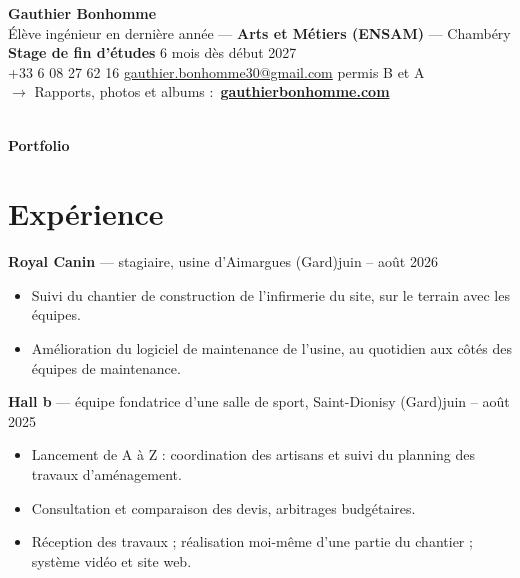 \documentclass[10pt,a4paper]{article}
\newcommand{\sep}{\,{\scriptsize\textbullet}\,}
\newcommand{\entry}[2]{\par\vspace{0.5em}#1\hfill #2\par}
\begin{document}
\begin{minipage}[c]{0.13\linewidth}\hfill\end{minipage}%
\begin{minipage}[c]{0.74\linewidth}
\centering
  {\Huge\bfseries Gauthier Bonhomme}\\[0.45em]
  Élève ingénieur en dernière année --- \textbf{Arts et Métiers (ENSAM)} --- Chambéry\\[0.15em]
  {\color{linkblue}\bfseries Stage de fin d'études}\sep 6 mois dès début 2027\\[0.25em]
  {\small +33 6 08 27 62 16\sep \href{mailto:gauthier.bonhomme30@gmail.com}{gauthier.bonhomme30@gmail.com}\sep permis B et A}\\[0.1em]
  {\small\color{linkblue}$\rightarrow$ Rapports, photos et albums :\ \textbf{\href{https://gauthierbonhomme.com}{gauthierbonhomme.com}}}
\end{minipage}%
\begin{minipage}[c]{0.13\linewidth}
\raggedleft
{\color{linkblue}}\\[0.15em]
{\scriptsize\color{linkblue}\bfseries Portfolio\hspace{0.32cm}}
\end{minipage}

\section{Expérience}

\entry{\textbf{Royal Canin} --- stagiaire, usine d'Aimargues (Gard)}{juin -- août 2026}
\begin{itemize}
  \item Suivi du chantier de construction de l'infirmerie du site, sur le terrain avec les équipes.
  \item Amélioration du logiciel de maintenance de l'usine, au quotidien aux côtés des équipes de maintenance.
\end{itemize}

\entry{\textbf{Hall b} --- équipe fondatrice d'une salle de sport, Saint-Dionisy (Gard)}{juin -- août 2025}
\begin{itemize}
  \item Lancement de A à Z : coordination des artisans et suivi du planning des travaux d'aménagement.
  \item Consultation et comparaison des devis, arbitrages budgétaires.
  \item Réception des travaux ; réalisation moi-même d'une partie du chantier ; système vidéo et site web.
\end{itemize}
\end{document}
